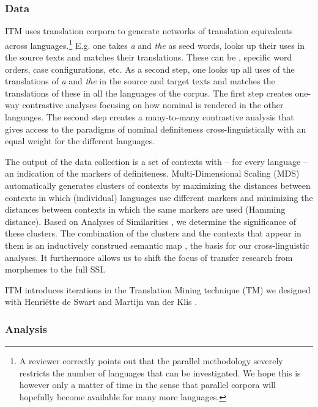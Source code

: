 \documentclass[output=paper,
modfonts
]{langscibook}
\begin{document}
\subsubsection{Data}

ITM uses translation corpora to generate networks of translation equivalents across languages.\footnote{A reviewer correctly points out that the parallel methodology severely restricts the number of languages that can be investigated. We hope this is however only a matter of time in the sense that parallel corpora will hopefully become available for many more languages.} E.g. one takes \textit{a} and \textit{the} as seed words, looks up their uses in the  source texts and matches their translations. These can be , specific word orders, case configurations, etc. As a second step, one looks up all uses of the translations of \textit{a} and \textit{the} in the source and target texts and matches the translations of these in all the languages of the corpus. The first step creates one-way contrastive analyses focusing on how  nominal  is rendered in the other languages. The second step creates a many-to-many contrastive analysis that gives access to the paradigms of nominal definiteness cross-linguistically with an equal weight for the different languages.

The output of the data collection is a set of contexts with -- for every language -- an indication of the markers of definiteness. Multi-Dimensional Scaling (MDS) automatically generates clusters of contexts by maximizing the distances between contexts in which (individual) languages use different markers and minimizing the distances between contexts in which the same markers are used (Hamming distance). Based on Analyses of Similarities \citep{Clarke1993,Oksanenetal2017}, we determine the significance of these clusters. The combination of the clusters and the contexts that appear in them is an inductively construed semantic map \citep{Haspelmath1997}, the basis for our cross-linguistic analyses. It furthermore allows us to shift the focus of transfer research from morphemes to the full SSI.

ITM introduces iterations in the Translation Mining technique (TM) we designed with Henriëtte de Swart and Martijn van der Klis \citep{vanderKlisetal2017}.

\subsubsection{Analysis}
\end{document}
